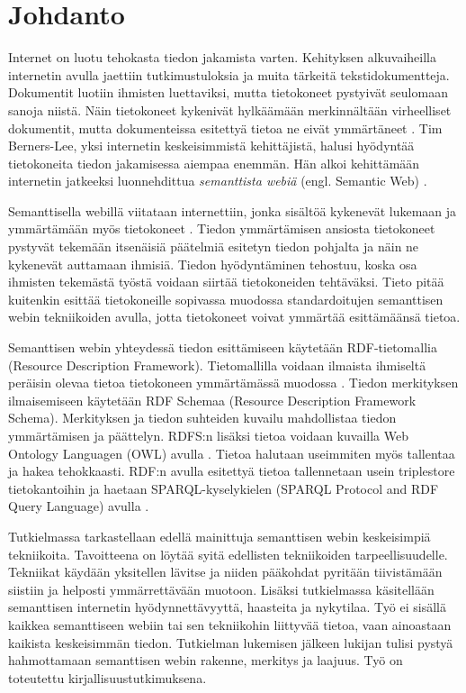 \documentclass[finnish, 12pt, a4paper, elec, utf8, pdfa, online]{aaltothesis}
\begin{document}
\section{Johdanto}

\thispagestyle{empty}
Internet on luotu tehokasta tiedon jakamista varten. Kehityksen alkuvaiheilla internetin avulla jaettiin tutkimustuloksia ja muita tärkeitä tekstidokumentteja. Dokumentit luotiin ihmisten luettaviksi, mutta tietokoneet pystyivät seulomaan sanoja niistä. Näin tietokoneet kykenivät hylkäämään merkinnältään virheelliset dokumentit, mutta dokumenteissa esitettyä tietoa ne eivät ymmärtäneet \cite{WWW}. Tim Berners-Lee, yksi internetin keskeisimmistä kehittäjistä, halusi hyödyntää tietokoneita tiedon jakamisessa aiempaa enemmän. Hän alkoi kehittämään internetin jatkeeksi luonnehdittua \textit{semanttista webiä} (engl. Semantic Web) \cite{Berners_visio}.

Semanttisella webillä viitataan internettiin, jonka sisältöä kykenevät lukemaan ja ymmärtämään myös tietokoneet \cite{Berners_visio}. Tiedon ymmärtämisen ansiosta tietokoneet pystyvät tekemään itsenäisiä päätelmiä esitetyn tiedon pohjalta ja näin ne kykenevät auttamaan ihmisiä. Tiedon hyödyntäminen tehostuu, koska osa ihmisten tekemästä työstä voidaan siirtää tietokoneiden tehtäväksi. Tieto pitää kuitenkin esittää tietokoneille sopivassa muodossa standardoitujen semanttisen webin tekniikoiden avulla, jotta tietokoneet voivat ymmärtää esittämäänsä tietoa.

Semanttisen webin yhteydessä tiedon esittämiseen käytetään RDF-tietomallia (Resource Description Framework). Tietomallilla voidaan ilmaista ihmiseltä peräisin olevaa tietoa tietokoneen ymmärtämässä muodossa \cite{RDF_specification}. Tiedon merkityksen ilmaisemiseen käytetään RDF Schemaa (Resource Description Framework Schema). Merkityksen ja tiedon suhteiden kuvailu mahdollistaa tiedon ymmärtämisen ja päättelyn. RDFS:n lisäksi tietoa voidaan kuvailla Web Ontology Languagen (OWL) avulla \cite{OWL_specification}. Tietoa halutaan useimmiten myös tallentaa ja hakea tehokkaasti. RDF:n avulla esitettyä tietoa tallennetaan usein triplestore tietokantoihin ja haetaan SPARQL-kyselykielen (SPARQL Protocol and RDF Query Language) avulla \cite{sparql}.

Tutkielmassa tarkastellaan edellä mainittuja semanttisen webin keskeisimpiä tekniikoita. Tavoitteena on löytää syitä edellisten tekniikoiden tarpeellisuudelle. Tekniikat käydään yksitellen lävitse ja niiden pääkohdat pyritään tiivistämään siistiin ja helposti ymmärrettävään muotoon. Lisäksi tutkielmassa käsitellään semanttisen internetin hyödynnettävyyttä, haasteita ja nykytilaa. Työ ei sisällä kaikkea semanttiseen webiin tai sen tekniikohin liittyvää tietoa, vaan ainoastaan kaikista keskeisimmän tiedon. Tutkielman lukemisen jälkeen lukijan tulisi pystyä hahmottamaan semanttisen webin rakenne, merkitys ja laajuus. Työ on toteutettu kirjallisuustutkimuksena.
\end{document}
